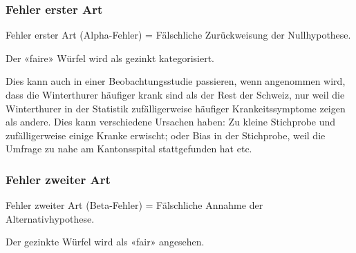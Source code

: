 \subsubsection{Fehler erster Art}
Fehler erster Art (Alpha-Fehler) = Fälschliche Zurückweisung der Nullhypothese.

Der «faire» Würfel wird als gezinkt kategorisiert.

Dies kann auch in einer Beobachtungsstudie passieren, wenn \zB
angenommen wird, dass die Winterthurer häufiger krank sind als der
Rest der Schweiz, nur weil die Winterthurer in der Statistik
zufälligerweise häufiger Krankeitssymptome zeigen als andere. Dies
kann verschiedene Ursachen haben: Zu kleine Stichprobe und
zufälligerweise einige Kranke erwischt; oder Bias in der Stichprobe,
weil die Umfrage zu nahe am Kantonsspital stattgefunden hat etc.

\subsubsection{Fehler zweiter Art}
Fehler zweiter Art (Beta-Fehler) = Fälschliche Annahme der Alternativhypothese.

Der gezinkte Würfel wird als «fair» angesehen.


\platzFuerBerechnungenBisEndeSeite{}
\newpage




